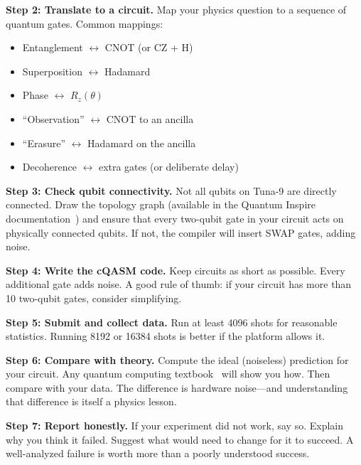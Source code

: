\documentclass[amsmath,amssymb,reprint,aps,prb]{revtex4-2}
\begin{document}
\textbf{Step 2: Translate to a circuit.}  Map your physics
question to a sequence of quantum gates.  Common mappings:
\begin{itemize}
\item Entanglement $\leftrightarrow$ CNOT (or CZ + H)
\item Superposition $\leftrightarrow$ Hadamard
\item Phase $\leftrightarrow$ $R_z(\theta)$
\item ``Observation'' $\leftrightarrow$ CNOT to an ancilla
\item ``Erasure'' $\leftrightarrow$ Hadamard on the ancilla
\item Decoherence $\leftrightarrow$ extra gates (or deliberate
      delay)
\end{itemize}

\textbf{Step 3: Check qubit connectivity.}  Not all qubits on
Tuna-9 are directly connected.  Draw the topology graph (available
in the Quantum Inspire documentation~\cite{QI2022}) and ensure
that every two-qubit gate in your circuit acts on physically
connected qubits.  If not, the compiler will insert SWAP gates,
adding noise.

\textbf{Step 4: Write the cQASM code.}  Keep circuits as short
as possible.  Every additional gate adds noise.  A good rule of
thumb: if your circuit has more than 10 two-qubit gates, consider
simplifying.

\textbf{Step 5: Submit and collect data.}  Run at least 4096
shots for reasonable statistics.  Running 8192 or 16384 shots is
better if the platform allows it.

\textbf{Step 6: Compare with theory.}  Compute the ideal
(noiseless) prediction for your circuit.  Any quantum computing
textbook~\cite{NielsenChuang2000} will show you how.  Then compare
with your data.  The difference is hardware noise---and
understanding that difference is itself a physics lesson.

\textbf{Step 7: Report honestly.}  If your experiment did not work,
say so.  Explain why you think it failed.  Suggest what would need
to change for it to succeed.  A well-analyzed failure is worth more
than a poorly understood success.
\end{document}
